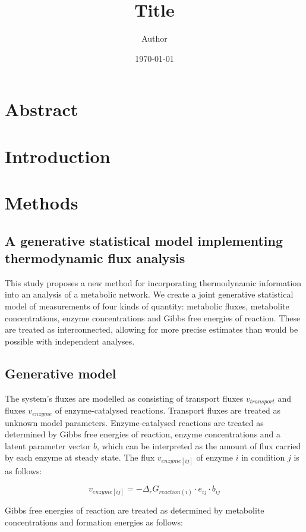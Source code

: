 \documentclass[11pt]{article}
\title{ Title}
\author{ Author }
\date{\today}
\begin{document}
	\maketitle	
	\pagebreak
	

\section{Abstract}

\section{Introduction}

\section{Methods}	
\subsection{A generative statistical model implementing thermodynamic flux analysis}

This study proposes a new method for incorporating thermodynamic information
into an analysis of a metabolic network. We create a joint generative
statistical model of measurements of four kinds of quantity: metabolic fluxes,
metabolite concentrations, enzyme concentrations and Gibbs free energies of
reaction. These are treated as interconnected, allowing for more precise
estimates than would be possible with independent analyses.

\subsection{Generative model}

The system's fluxes are modelled as consisting of transport fluxes
$v_{transport}$ and fluxes $v_{enzyme}$ of enzyme-catalysed
reactions. Transport fluxes are treated as unknown model
parameters. Enzyme-catalysed reactions are treated as determined by Gibbs free
energies of reaction, enzyme concentrations and a latent parameter vector $b$,
which can be interpreted as the amount of flux carried by each enzyme at steady
state. The flux $v_{enzyme[ij]}$ of enzyme $i$ in condition $j$ is as follows:

$$
v_{enzyme[ij]} = -\Delta_rG_{reaction(i)} \cdot e_{ij} \cdot b_{ij}
$$

Gibbs free energies of reaction are treated as determined by metabolite
concentrations and formation energies as follows:
\end{document}
